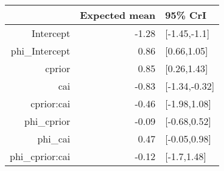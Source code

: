 \begin{tabular}{rrl}
  \hline
 & Expected mean & 95\% CrI \\ 
  \hline
Intercept & -1.28 & [-1.45,-1.1] \\ 
  phi\_Intercept & 0.86 & [0.66,1.05] \\ 
  cprior & 0.85 & [0.26,1.43] \\ 
  cai & -0.83 & [-1.34,-0.32] \\ 
  cprior:cai & -0.46 & [-1.98,1.08] \\ 
  phi\_cprior & -0.09 & [-0.68,0.52] \\ 
  phi\_cai & 0.47 & [-0.05,0.98] \\ 
  phi\_cprior:cai & -0.12 & [-1.7,1.48] \\ 
   \hline
\end{tabular}

